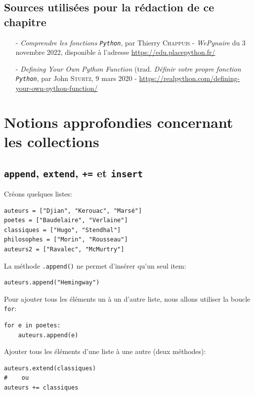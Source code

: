 \documentclass[a4paper,11pt]{book}
\begin{document}
\section*{Sources utilisées pour la rédaction de ce chapitre}
\begin{itemize}
	\item[-] \textit{Comprendre les fonctions \texttt{Python}}, par Thierry \textsc{Chappuis} - \textit{WePynaire} du 3 novembre 2022, disponible à l'adresse \url{https://edu.placepython.fr/}
	\item[-] \textit{Defining Your Own Python Function} (trad. \og \textit{Définir votre propre fonction \texttt{Python}\fg{}}, par  John \textsc{Sturtz}, 9 mars 2020 - \url{https://realpython.com/defining-your-own-python-function/}
\end{itemize}
\medskip

\chapter{Notions approfondies concernant les collections}
\section{\texttt{append}, \texttt{extend}, \texttt{+=} et \texttt{insert}}
Créons quelques listes:
\begin{lstlisting}
auteurs = ["Djian", "Kerouac", "Marsé"]
poetes = ["Baudelaire", "Verlaine"]
classiques = ["Hugo", "Stendhal"]
philosophes = ["Morin", "Rousseau"]
auteurs2 = ["Ravalec", "McMurtry"]
\end{lstlisting}
\medskip

La méthode \texttt{.append()} ne permet d'insérer qu'un seul item:
\begin{lstlisting}
auteurs.append("Hemingway")
\end{lstlisting}
\medskip

Pour ajouter tous les éléments un à un d'autre liste, nous allons utiliser la boucle \texttt{for}:
\begin{lstlisting}
for e in poetes:
    auteurs.append(e)
\end{lstlisting}
\medskip

Ajouter tous les éléments d'une liste à une autre (deux méthodes):
\begin{lstlisting}
auteurs.extend(classiques)
#    ou
auteurs += classiques
\end{lstlisting}
\medskip
\end{document}
